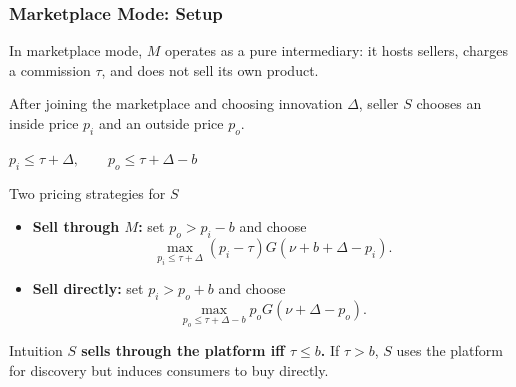 \begin{frame}
  \frametitle{Marketplace Mode: Setup}
  \footnotesize
  In marketplace mode, $M$ operates as a pure intermediary: it hosts sellers,
  charges a commission $\tau$, and does not sell its own product.

  After joining the marketplace and choosing innovation $\Delta$, seller $S$
  chooses an inside price $p_i$ and an outside price $p_o$.

  \begin{center}
    \hypertarget{mp_price_bounds_src}{%
      \hyperlink{mp_price_bounds_deriv}{%
        $\displaystyle p_i \leq \tau+\Delta, \qquad
        p_o \leq \tau+\Delta-b$}}
  \end{center}

  \begin{block}{Two pricing strategies for $S$}
    \begin{itemize}
      \item \textbf{Sell through $M$:} set $p_o>p_i-b$ and choose
      \[
        \max_{p_i\leq \tau+\Delta}(p_i-\tau)
        G(\nu+b+\Delta-p_i).
      \]
      \item \textbf{Sell directly:} set $p_i>p_o+b$ and choose
      \[
        \max_{p_o\leq \tau+\Delta-b}p_oG(\nu+\Delta-p_o).
      \]
    \end{itemize}
  \end{block}

  \begin{alertblock}{Intuition}
    \textbf{$S$ sells through the platform iff $\tau\leq b$.} If $\tau>b$,
    $S$ uses the platform for discovery but induces consumers to buy directly.
  \end{alertblock}
\end{frame}


